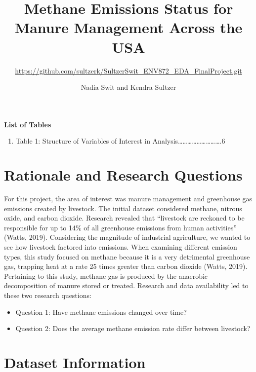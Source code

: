 \documentclass[
  12pt,
]{article}
\title{Methane Emissions Status for Manure Management Across the USA}
\subtitle{\url{https://github.com/sultzerk/SultzerSwit_ENV872_EDA_FinalProject.git}}
\author{Nadia Swit and Kendra Sultzer}
\date{}
\providecommand{\tightlist}{%
  \setlength{\itemsep}{0pt}\setlength{\parskip}{0pt}}
\begin{document}
\maketitle

\newpage
\tableofcontents 
\newpage

\textbf{List of Tables}

\begin{enumerate}
\def\labelenumi{\arabic{enumi}.}
\tightlist
\item
  Table 1: Structure of Variables of Interest in
  Analysis\ldots\ldots\ldots\ldots\ldots\ldots\ldots\ldots\ldots.6
  \newpage

  \listoffigures 
  \newpage
\end{enumerate}

\hypertarget{rationale-and-research-questions}{%
\section{Rationale and Research
Questions}\label{rationale-and-research-questions}}

For this project, the area of interest was manure management and
greenhouse gas emissions created by livestock. The initial dataset
considered methane, nitrous oxide, and carbon dioxide. Research revealed
that ``livestock are reckoned to be responsible for up to 14\% of all
greenhouse emissions from human activities'' (Watts, 2019). Considering
the magnitude of industrial agriculture, we wanted to see how livestock
factored into emissions. When examining different emission types, this
study focused on methane because it is a very detrimental greenhouse
gas, trapping heat at a rate 25 times greater than carbon dioxide
(Watts, 2019). Pertaining to this study, methane gas is produced by the
anaerobic decomposition of manure stored or treated. Research and data
availability led to these two research questions:

\begin{itemize}
\item
  Question 1: Have methane emissions changed over time?
\item
  Question 2: Does the average methane emission rate differ between
  livestock?
\end{itemize}

\newpage

\hypertarget{dataset-information}{%
\section{Dataset Information}\label{dataset-information}}
\end{document}
